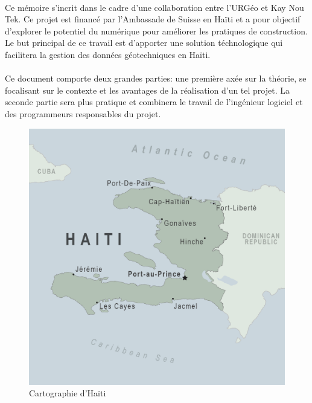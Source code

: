 
    \paragraph{}
    Ce mémoire s'incrit dans le cadre d'une collaboration entre
    l'URGéo et Kay Nou Tek. Ce projet est financé par l’Ambassade
    de Suisse en Haïti et a pour objectif d’explorer le potentiel 
    du numérique pour améliorer les pratiques de construction.
    Le but principal de ce travail est
    d'apporter une solution téchnologique  qui facilitera la 
    gestion des données géotechniques en Haïti.
    \paragraph{}
    Ce document comporte deux grandes parties: une première axée
    sur la théorie, se focalisant sur le contexte et les avantages
    de la réalisation d'un tel projet. La seconde partie sera plus pratique
    et combinera le travail de l'ingénieur logiciel et des programmeurs responsables
    du projet.
    \begin{figure}
        \centering
        \includegraphics[width=1\textwidth]{images/Contexte/map-haiti.png}
        \caption{Cartographie d'Haïti}
    \end{figure}